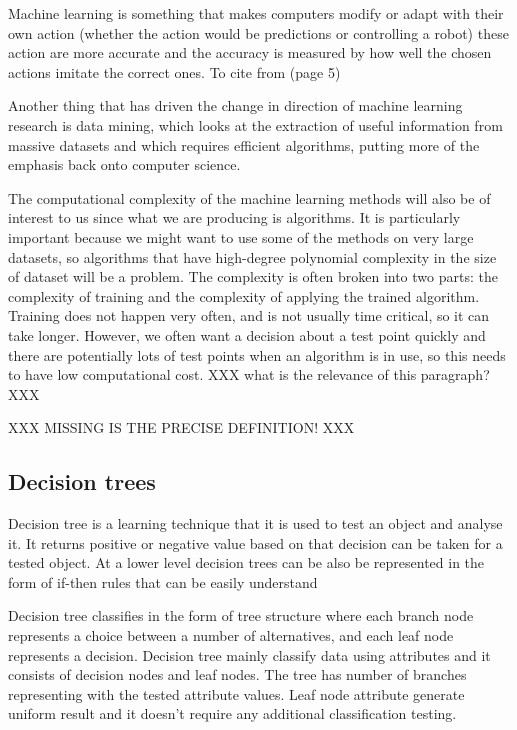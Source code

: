 \documentclass{article}
\begin{document}
Machine learning is something that makes computers modify or adapt with their own action (whether the action would be predictions or controlling a robot) these action are more accurate and the accuracy is measured by how well the chosen actions imitate the correct ones. To cite from \cite{MachineLearning2009AlgorithmicPerspective}
(page 5)
 

Another thing that has driven the change in direction of machine learning research is data mining, which looks at the extraction of useful information from massive datasets and which requires efficient algorithms, putting more of the emphasis back onto computer science. 

The computational complexity of the machine learning methods will also be of interest to us since what we are producing is algorithms. It is particularly important because we might want to use some of the methods on very large datasets, so algorithms that have high-degree polynomial complexity in the size of dataset will be a problem. The complexity is often broken into two parts: the complexity of training and the complexity of applying the trained algorithm.
Training does not happen very often, and is not usually time critical, so it can take longer. However, we often want a decision about a test point quickly and there are potentially lots of test points when an algorithm is in use, so this needs to have low computational cost. XXX what is the relevance of this paragraph? XXX

XXX MISSING IS THE PRECISE DEFINITION! XXX


\subsection{Decision trees}
\label{sec:dectree}


Decision tree is a learning technique that it is used to test an object and analyse it. It returns positive or negative value based on that decision can be taken for a tested object. At a lower level decision trees can be also be represented in the form of if-then rules that can be easily understand

Decision tree classifies in the form of tree structure where each branch node represents a choice between a number of alternatives, and each leaf node represents a decision. Decision tree mainly classify data using attributes and it consists of decision nodes and leaf nodes. The tree has number of branches representing with the tested attribute values. Leaf node attribute generate uniform result and it doesn't require any additional classification testing.
\end{document}
